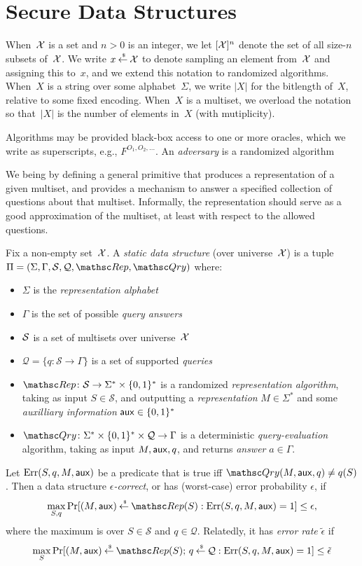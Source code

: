 \section{Secure Data Structures}
\def\pub{{\sf pub}}
\def\aux{{\sf aux}}

When~${\cal X}$ is a set and $n>0$ is an integer, we let $[{\cal X}]^n$ denote the set of all size-$n$ subsets of~${\cal X}$. We write $x {\:\stackrel{{\scriptscriptstyle \hspace{0.2em}\$}} {\leftarrow}\:} {\cal X}$ to denote sampling an element from~${\cal X}$ and assigning this to~$x$, and we extend this notation to randomized algorithms.  When~$X$ is a string over some alphabet~$\Sigma$, we write $|X|$ for the bitlength of~$X$, relative to some fixed encoding.  When~$X$ is a multiset, we overload the notation so that~$|X|$ is the number of elements in~$X$ (with mutiplicity).

Algorithms may be provided black-box access to one or more oracles, which we write as superscripts, e.g., $F^{O_1,O_2,\ldots}$.  An \emph{adversary} is a randomized algorithm

  We being by defining a general primitive that produces a representation of a given multiset, and provides a mechanism to answer a specified collection of questions about that multiset.  Informally, the representation should serve as a good approximation of the multiset, at least with respect to the allowed questions.
\begin{definition} 
Fix a non-empty set~${\cal X}$. A \emph{static data structure} (over universe~${\cal X}$)
is a tuple $\setprim=(\Sigma,\Gamma,\calS,\calQ,\Rep, \Qry)$ where:
\begin{itemize}
\item $\Sigma$ is the \emph{representation alphabet}
\item $\Gamma$ is the set of possible \emph{query answers}
\item ${\cal S}$ is a set  of multisets over universe~${\cal X}$
\item $\mathcal{Q}=\{q \colon \mathcal{S} \to \Gamma\}$ is a set of supported \emph{queries}
\item $\Rep \colon \mathcal{S} \to \Sigma^* \times \bits^*$ is a randomized \emph{representation algorithm}, taking as input $S \in \mathcal{S}$, and outputting a \emph{representation} $M \in \Sigma^*$ and some \emph{auxilliary information} $\aux \in \bits^*$
\item $\Qry\colon \Sigma^* \times \bits^* \times \calQ \to \Gamma$ is a deterministic \emph{query-evaluation} algorithm, taking as input $M, \aux, q$, and returns \emph{answer} $a \in \Gamma$.
\end{itemize}
Let $\mathrm{Err}(S,q,M,\aux)$ be a predicate that is true iff $\Qry(M, \aux, q) \neq q(S)$.  Then a data structure
\emph{$\epsilon$-correct}, or has (worst-case) error probability $\epsilon$, if
\[
\max_{S,q}\Pr[(M,\aux) \getsr \Rep(S) : \mathrm{Err}(S,q,M,\aux)=1 ] \leq \epsilon, \label{eqn:correctness}
\]
where the maximum is over $S \in \mathcal{S}$ and $q \in \mathcal{Q}$.  Relatedly, it has \emph{error rate} $\tilde{\epsilon}$ if
\[
\max_{S}\Pr[(M,\aux) \getsr \Rep(S);\, q \getsr \calQ : \mathrm{Err}(S,q,M,\aux)=1] \leq \tilde{\epsilon} \label{eqn:error_rate}
\]
\end{definition}

